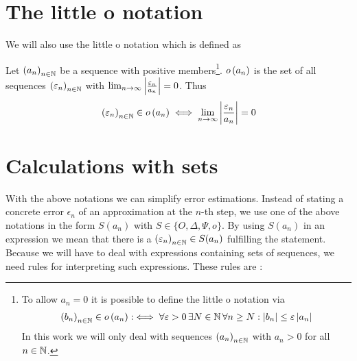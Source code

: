 \section{The little o notation}

We will also use the little o notation which is defined as~\cite[pp.~99,~103]{aigner}\cite[p.~385]{hachenberger}\cite{wiki:bigo}

\begin{definition}
  Let $\left({a_n}\right)_{{n}\in\mathbb N}$ be a sequence with positive members\footnote{To allow $a_n=0$ it is possible to define the little o notation via~\cite[pp.~448]{graham}\cite{wiki:bigo}
  \begin{align}
    \left({b_n}\right)_{{n}\in\mathbb N}\in o\left( {a_n} \right) :\iff \forall \varepsilon > 0\, \exists N\in\mathbb N\, \forall n \ge N: \left|{b_n}\right| \le \varepsilon \left|{a_n}\right|
  \end{align}
   In this work we will only deal with sequences $\left({a_n}\right)_{{n}\in\mathbb N}$ with $a_n > 0$ for all $n\in\mathbb N$.
}. $o\left( {a_n} \right)$ is the set of all sequences $\left({\varepsilon_n}\right)_{{n}\in\mathbb N}$ with $\lim_{n\to\infty} \left|{\frac{\varepsilon_n}{a_n}}\right| = 0$. Thus
  \begin{align}
    \left({\varepsilon_n}\right)_{{n}\in\mathbb N}\in o\left( {a_n} \right) \iff \lim_{n\to\infty} \left|{\frac{\varepsilon_n}{a_n}}\right| = 0
  \end{align}
\end{definition}

\section{Calculations with sets} \label{sec:calculations_sets}

With the above notations we can simplify error estimations. Instead of stating a concrete error $\epsilon_n$ of an approximation at the $n$-th step, we use one of the above notations in the form $S(a_n)$ with $S\in\{O, \Delta, \Psi, o\}$. By using $S(a_n)$ in an expression we mean that there is a $\left({\varepsilon_n}\right)_{{n}\in\mathbb N}\in S(a_n)$ fulfilling the statement. Because we will have to deal with expressions containing sets of sequences, we need rules for interpreting such expressions. These rules are \cite{bigo_rules1}\cite[pp. 17-18]{kulla}:

